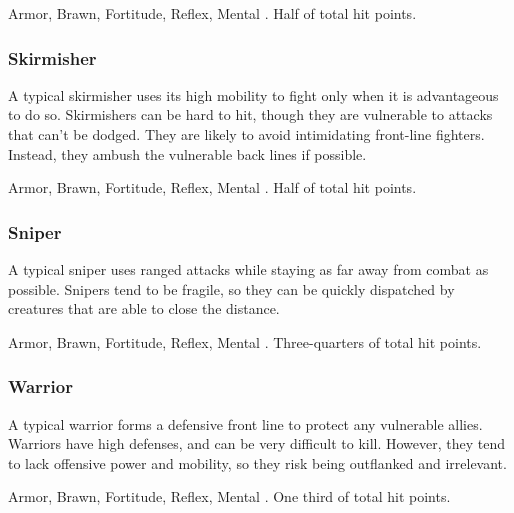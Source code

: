         Armor,  Brawn,  Fortitude,  Reflex,  Mental
       .
       Half of total hit points.

    \subsubsection{Skirmisher}
      A typical skirmisher uses its high mobility to fight only when it is advantageous to do so.
      Skirmishers can be hard to hit, though they are vulnerable to attacks that can't be dodged.
      They are likely to avoid intimidating front-line fighters.
      Instead, they ambush the vulnerable back lines if possible.

        Armor,  Brawn,  Fortitude,  Reflex,  Mental
       .
       Half of total hit points.

    \subsubsection{Sniper}
      A typical sniper uses ranged attacks while staying as far away from combat as possible.
      Snipers tend to be fragile, so they can be quickly dispatched by creatures that are able to close the distance.

        Armor,  Brawn,  Fortitude,  Reflex,  Mental
       .
       Three-quarters of total hit points.

    \subsubsection{Warrior}
      A typical warrior forms a defensive front line to protect any vulnerable allies.
      Warriors have high defenses, and can be very difficult to kill.
      However, they tend to lack offensive power and mobility, so they risk being outflanked and irrelevant.

        Armor,  Brawn,  Fortitude,  Reflex,  Mental
       .
       One third of total hit points.

